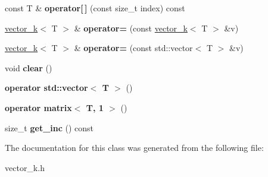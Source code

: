 \begin{DoxyCompactItemize}
\item 
\hypertarget{classkeycpp_1_1vector__k_af9fc299b3eecce09bb7166954acf7b16}{const T \& {\bfseries operator\mbox{[}$\,$\mbox{]}} (const size\-\_\-t index) const }\label{classkeycpp_1_1vector__k_af9fc299b3eecce09bb7166954acf7b16}

\item 
\hypertarget{classkeycpp_1_1vector__k_ab2030403334539d7df1001e8b9037fa9}{\hyperlink{classkeycpp_1_1vector__k}{vector\-\_\-k}$<$ T $>$ \& {\bfseries operator=} (const \hyperlink{classkeycpp_1_1vector__k}{vector\-\_\-k}$<$ T $>$ \&v)}\label{classkeycpp_1_1vector__k_ab2030403334539d7df1001e8b9037fa9}

\item 
\hypertarget{classkeycpp_1_1vector__k_a318832966719bc35aa0147ec2aeabb6f}{\hyperlink{classkeycpp_1_1vector__k}{vector\-\_\-k}$<$ T $>$ \& {\bfseries operator=} (const std\-::vector$<$ T $>$ \&v)}\label{classkeycpp_1_1vector__k_a318832966719bc35aa0147ec2aeabb6f}

\item 
\hypertarget{classkeycpp_1_1vector__k_a926f7d20093e3b36e92f10aaeea1e909}{void {\bfseries clear} ()}\label{classkeycpp_1_1vector__k_a926f7d20093e3b36e92f10aaeea1e909}

\item 
\hypertarget{classkeycpp_1_1vector__k_a54ffbb92ed1926e6066d26db886b4132}{{\bfseries operator std\-::vector$<$ T $>$} ()}\label{classkeycpp_1_1vector__k_a54ffbb92ed1926e6066d26db886b4132}

\item 
\hypertarget{classkeycpp_1_1vector__k_a29924719e16f5db7308addc0b6e60160}{{\bfseries operator matrix$<$ T, 1 $>$} ()}\label{classkeycpp_1_1vector__k_a29924719e16f5db7308addc0b6e60160}

\item 
\hypertarget{classkeycpp_1_1vector__k_a09f9ee871078a9f6602d564088a0e2ac}{size\-\_\-t {\bfseries get\-\_\-inc} () const }\label{classkeycpp_1_1vector__k_a09f9ee871078a9f6602d564088a0e2ac}

\end{DoxyCompactItemize}


The documentation for this class was generated from the following file\-:\begin{DoxyCompactItemize}
\item 
vector\-\_\-k.\-h\end{DoxyCompactItemize}
